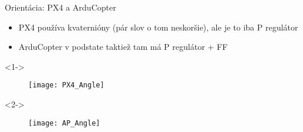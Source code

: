   \begin{frame}[t]{Orientácia: PX4 a ArduCopter}
\begin{itemize}
  \item<1-> PX4 používa kvaternióny (pár slov o tom neskoršie), ale je to iba P regulátor
  \item<2-> ArduCopter v podstate taktiež tam má P regulátor + FF
\end{itemize}

  \begin{onlyenv}<1->
  \begin{figure}
\centering
  \texttt{[image: PX4\_Angle]}\\
\end{figure}
\end{onlyenv}


  \begin{onlyenv}<2->
  \begin{figure}
\centering
  \texttt{[image: AP\_Angle]}\\
\end{figure}
\end{onlyenv}

  \end{frame}

